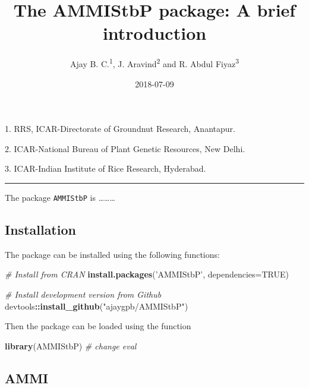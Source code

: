 \documentclass[]{article}
\title{The \textbf{AMMIStbP} package: A brief introduction}
\author{Ajay B. C.\textsuperscript{1}, J. Aravind\textsuperscript{2} and R.
Abdul Fiyaz\textsuperscript{3}}
\date{2018-07-09}
\newenvironment{Shaded}{\begin{snugshade}}{\end{snugshade}}
\newcommand{\CommentTok}[1]{\textcolor[rgb]{0.56,0.35,0.01}{\textit{#1}}}
\newcommand{\DataTypeTok}[1]{\textcolor[rgb]{0.13,0.29,0.53}{#1}}
\newcommand{\KeywordTok}[1]{\textcolor[rgb]{0.13,0.29,0.53}{\textbf{#1}}}
\newcommand{\NormalTok}[1]{#1}
\newcommand{\OperatorTok}[1]{\textcolor[rgb]{0.81,0.36,0.00}{\textbf{#1}}}
\newcommand{\OtherTok}[1]{\textcolor[rgb]{0.56,0.35,0.01}{#1}}
\newcommand{\StringTok}[1]{\textcolor[rgb]{0.31,0.60,0.02}{#1}}
\begin{document}
\maketitle

\begin{center}
1. RRS, ICAR-Directorate of Groundnut Research, Anantapur.

2. ICAR-National Bureau of Plant Genetic Resources, New Delhi.

3. ICAR-Indian Institute of Rice Research, Hyderabad.
\end{center}

\begin{center}
\vspace{6pt}
\hrule
\end{center}

\tableofcontents

The package \texttt{AMMIStbP} is \ldots{}\ldots{}\ldots{}

\hypertarget{installation}{%
\subsection{Installation}\label{installation}}

The package can be installed using the following functions:

\begin{Shaded}
\begin{Highlighting}[]
\CommentTok{# Install from CRAN}
\KeywordTok{install.packages}\NormalTok{(}\StringTok{'AMMIStbP'}\NormalTok{, }\DataTypeTok{dependencies=}\OtherTok{TRUE}\NormalTok{)}

\CommentTok{# Install development version from Github}
\NormalTok{devtools}\OperatorTok{::}\KeywordTok{install_github}\NormalTok{(}\StringTok{"ajaygpb/AMMIStbP"}\NormalTok{)}
\end{Highlighting}
\end{Shaded}

Then the package can be loaded using the function

\begin{Shaded}
\begin{Highlighting}[]
\KeywordTok{library}\NormalTok{(AMMIStbP) }\CommentTok{# change eval}
\end{Highlighting}
\end{Shaded}

\hypertarget{ammi}{%
\subsection{AMMI}\label{ammi}}
\end{document}
